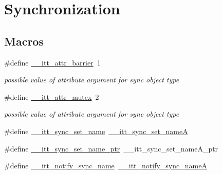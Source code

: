 \hypertarget{group__legacy__sync}{\section{Synchronization}
\label{group__legacy__sync}
}
\subsection*{Macros}
\begin{DoxyCompactItemize}
\item 
\#define \hyperlink{group__legacy__sync_gaa2de2b08cecad1d567b5312c503ad217}{\-\_\-\-\_\-itt\-\_\-attr\-\_\-barrier}~1
\begin{DoxyCompactList}\small\item\em possible value of attribute argument for sync object type \end{DoxyCompactList}\item 
\#define \hyperlink{group__legacy__sync_ga8c78a4fc23e9e2ed0f3d19cd92c7a60d}{\-\_\-\-\_\-itt\-\_\-attr\-\_\-mutex}~2
\begin{DoxyCompactList}\small\item\em possible value of attribute argument for sync object type \end{DoxyCompactList}\item 
\#define \hyperlink{group__legacy__sync_gac12bf88c486ee4c22a9b96fde51c642f}{\-\_\-\-\_\-itt\-\_\-sync\-\_\-set\-\_\-name}~\hyperlink{group__legacy__sync_ga8e63e2fa02de5df802490554d8ff0a41}{\-\_\-\-\_\-itt\-\_\-sync\-\_\-set\-\_\-name\-A}
\item 
\#define \hyperlink{group__legacy__sync_gab78bffdbce7f664ea5f9ebe516870966}{\-\_\-\-\_\-itt\-\_\-sync\-\_\-set\-\_\-name\-\_\-ptr}~\-\_\-\-\_\-itt\-\_\-sync\-\_\-set\-\_\-name\-A\-\_\-ptr
\item 
\#define \hyperlink{group__legacy__sync_ga9b2bad86cdf5af6dec15777096fad3e1}{\-\_\-\-\_\-itt\-\_\-notify\-\_\-sync\-\_\-name}~\hyperlink{group__legacy__sync_gaa9a3eba5828bf261c60fc84e23c98ae1}{\-\_\-\-\_\-itt\-\_\-notify\-\_\-sync\-\_\-name\-A}
\end{DoxyCompactItemize}
